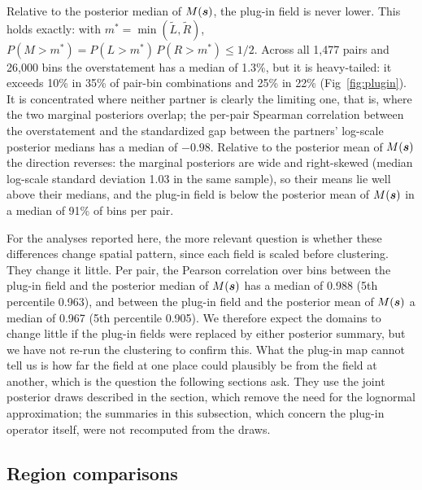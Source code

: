 \documentclass[10pt,letterpaper]{article}
\begin{document}
Relative to the posterior median of $M(\mbox{\boldmath $s$})$, the plug-in field is never lower. This holds exactly: with $m^* = \min(\tilde{L}, \tilde{R})$, $P(M > m^*) = P(L > m^*)\,P(R > m^*) \le 1/2$. Across all 1,477 pairs and 26,000 bins the overstatement has a median of 1.3\%, but it is heavy-tailed: it exceeds 10\% in 35\% of pair-bin combinations and 25\% in 22\% (Fig~\ref{fig:plugin}). It is concentrated where neither partner is clearly the limiting one, that is, where the two marginal posteriors overlap; the per-pair Spearman correlation between the overstatement and the standardized gap between the partners' log-scale posterior medians has a median of $-0.98$. Relative to the posterior mean of $M(\mbox{\boldmath $s$})$ the direction reverses: the marginal posteriors are wide and right-skewed (median log-scale standard deviation 1.03 in the same sample), so their means lie well above their medians, and the plug-in field is below the posterior mean of $M(\mbox{\boldmath $s$})$ in a median of 91\% of bins per pair.

For the analyses reported here, the more relevant question is whether these differences change spatial pattern, since each field is scaled before clustering. They change it little. Per pair, the Pearson correlation over bins between the plug-in field and the posterior median of $M(\mbox{\boldmath $s$})$ has a median of 0.988 (5th percentile 0.963), and between the plug-in field and the posterior mean of $M(\mbox{\boldmath $s$})$ a median of 0.967 (5th percentile 0.905). We therefore expect the domains to change little if the plug-in fields were replaced by either posterior summary, but we have not re-run the clustering to confirm this. What the plug-in map cannot tell us is how far the field at one place could plausibly be from the field at another, which is the question the following sections ask. They use the joint posterior draws described in the  section, which remove the need for the lognormal approximation; the summaries in this subsection, which concern the plug-in operator itself, were not recomputed from the draws.

\subsection*{Region comparisons}
\label{sec:res-regions}
\end{document}
